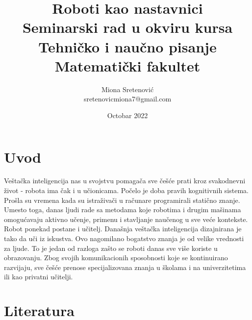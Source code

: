 \documentclass[]{article}
\title{Roboti kao nastavnici \\ Seminarski rad u okviru kursa \\ Tehničko i naučno pisanje \\ Matematički fakultet}
\author{ Miona Sretenović \\ sretenovicmiona7@gmail.com }
\date{Octobar 2022}
\begin{document}
\maketitle
\tableofcontents

\section{Uvod} 
Veštačka inteligencija nas u svojstvu pomagača sve češće prati kroz svakodnevni život - robota ima čak i u učionicama. Počelo je doba pravih kognitivnih sistema. Prošla su vremena kada su istraživači u računare programirali statično znanje. Umesto toga, danas ljudi rade sa metodama koje robotima i drugim mašinama omogućavaju aktivno učenje, primenu i stavljanje naučenog u sve veće kontekste. Robot ponekad postane i učitelj. Današnja veštačka inteligencija dizajnirana je tako da uči iz iskustva. Ovo nagomilano bogatstvo znanja je od velike vrednosti za ljude. To je jedan od razloga zašto se roboti danas sve više koriste u obrazovanju. Zbog svojih komunikacionih sposobnosti koje se kontinuirano razvijaju, sve češće prenose specijalizovana znanja u školama i na univerzitetima ili kao privatni učitelji.
\section{Literatura}
\end{document}
